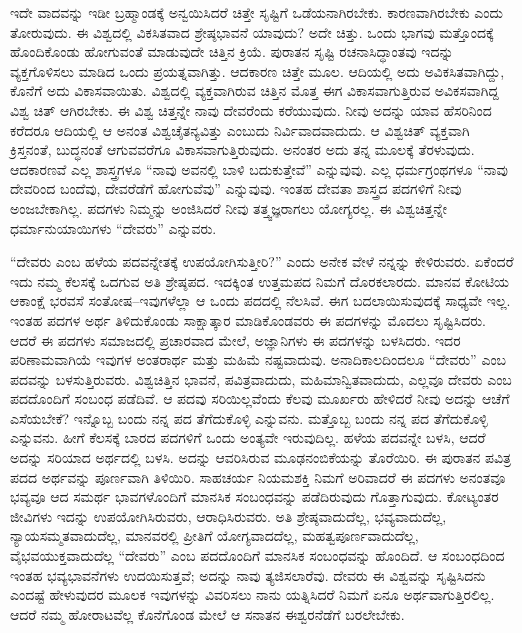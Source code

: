 ಇದೇ ವಾದವನ್ನು ಇಡೀ ಬ್ರಹ್ಮಾಂಡಕ್ಕೆ ಅನ್ವಯಿಸಿದರೆ ಚಿತ್ತೇ ಸೃಷ್ಟಿಗೆ ಒಡೆಯನಾಗಿರಬೇಕು. ಕಾರಣವಾಗಿರಬೇಕು ಎಂದು ತೋರುವುದು. ಈ ವಿಶ್ವದಲ್ಲಿ ವಿಕಸಿತವಾದ ಶ್ರೇಷ್ಠಭಾವನೆ ಯಾವುದು? ಅದೇ ಚಿತ್ತು. ಒಂದು ಭಾಗವು ಮತ್ತೊಂದಕ್ಕೆ ಹೊಂದಿಕೊಂಡು ಹೋಗುವಂತೆ ಮಾಡುವುದೇ ಚಿತ್ತಿನ ಕ್ರಿಯೆ. ಪುರಾತನ ಸೃಷ್ಟಿ ರಚನಾಸಿದ್ಧಾಂತವು ಇದನ್ನು ವ್ಯಕ್ತಗೊಳಿಸಲು ಮಾಡಿದ ಒಂದು ಪ್ರಯತ್ನವಾಗಿತ್ತು. ಆದಕಾರಣ ಚಿತ್ತೇ ಮೂಲ. ಆದಿಯಲ್ಲಿ ಅದು ಅವಿಕಸಿತವಾಗಿದ್ದು, ಕೊನೆಗೆ ಅದು ವಿಕಾಸವಾಯಿತು. ವಿಶ್ವದಲ್ಲಿ ವ್ಯಕ್ತವಾಗಿರುವ ಚಿತ್ತಿನ ಮೊತ್ತ ಈಗ ವಿಕಾಸವಾಗುತ್ತಿರುವ ಅವಿಕಸವಾಗಿದ್ದ ವಿಶ್ವ ಚಿತ್​ ಆಗಿರಬೇಕು. ಈ ವಿಶ್ವ ಚಿತ್ತನ್ನೇ ನಾವು ದೇವರೆಂದು ಕರೆಯುವುದು. ನೀವು ಅದನ್ನು ಯಾವ ಹೆಸರಿನಿಂದ ಕರೆದರೂ ಆದಿಯಲ್ಲಿ ಆ ಅನಂತ ವಿಶ್ವಚೈತನ್ಯವಿತ್ತು ಎಂಬುದು ನಿರ್ವಿವಾದವಾದುದು. ಆ ವಿಶ್ವಚಿತ್​ ವ್ಯಕ್ತವಾಗಿ ಕ್ರಿಸ್ತನಂತೆ, ಬುದ್ಧನಂತೆ ಆಗುವವರೆಗೂ ವಿಕಾಸವಾಗುತ್ತಿರುವುದು. ಅನಂತರ ಅದು ತನ್ನ ಮೂಲಕ್ಕೆ ತೆರಳುವುದು. ಆದಕಾರಣವೆ ಎಲ್ಲ ಶಾಸ್ತ್ರಗಳೂ “ನಾವು ಅವನಲ್ಲಿ ಬಾಳಿ ಬದುಕುತ್ತೇವೆ” ಎನ್ನುವುವು. ಎಲ್ಲ ಧರ್ಮಗ್ರಂಥಗಳೂ “ನಾವು ದೇವರಿಂದ ಬಂದೆವು, ದೇವರೆಡೆಗೆ ಹೋಗುವೆವು” ಎನ್ನುವುವು. ಇಂತಹ ದೇವತಾ ಶಾಸ್ತ್ರದ ಪದಗಳಿಗೆ ನೀವು ಅಂಜಬೇಕಾಗಿಲ್ಲ. ಪದಗಳು ನಿಮ್ಮನ್ನು ಅಂಜಿಸಿದರೆ ನೀವು ತತ್ತ್ವಜ್ಞರಾಗಲು ಯೋಗ್ಯರಲ್ಲ. ಈ ವಿಶ್ವಚಿತ್ತನ್ನೇ ಧರ್ಮಾನುಯಾಯಿಗಳು “ದೇವರು” ಎನ್ನುವರು.


“ದೇವರು ಎಂಬ ಹಳೆಯ ಪದವನ್ನೇತಕ್ಕೆ ಉಪಯೋಗಿಸುತ್ತೀರಿ?” ಎಂದು ಅನೇಕ ವೇಳೆ ನನ್ನನ್ನು ಕೇಳಿರುವರು. ಏಕೆಂದರೆ ಇದು ನಮ್ಮ ಕೆಲಸಕ್ಕೆ ಒದಗುವ ಅತಿ ಶ್ರೇಷ್ಠಪದ. ಇದಕ್ಕಿಂತ ಉತ್ತಮಪದ ನಿಮಗೆ ದೊರಕಲಾರದು. ಮಾನವ ಕೋಟಿಯ ಆಕಾಂಕ್ಷೆ ಭರವಸೆ ಸಂತೋಷ–ಇವುಗಳೆಲ್ಲಾ ಆ ಒಂದು ಪದದಲ್ಲಿ ನೆಲಸಿವೆ. ಈಗ ಬದಲಾಯಿಸುವುದಕ್ಕೆ ಸಾಧ್ಯವೇ ಇಲ್ಲ. ಇಂತಹ ಪದಗಳ ಅರ್ಥ ತಿಳಿದುಕೊಂಡು ಸಾಕ್ಷಾತ್ಕಾರ ಮಾಡಿಕೊಂಡವರು ಈ ಪದಗಳನ್ನು ಮೊದಲು ಸೃಷ್ಟಿಸಿದರು. ಆದರೆ ಈ ಪದಗಳು ಸಮಾಜದಲ್ಲಿ ಪ್ರಚಾರವಾದ ಮೇಲೆ, ಅಜ್ಞಾನಿಗಳು ಈ ಪದಗಳನ್ನು ಬಳಸಿದರು. ಇದರ ಪರಿಣಾಮವಾಗಿಯೆ ಇವುಗಳ ಅಂತರಾರ್ಥ ಮತ್ತು ಮಹಿಮೆ ನಷ್ಟವಾದುವು. ಅನಾದಿಕಾಲದಿಂದಲೂ “ದೇವರು” ಎಂಬ ಪದವನ್ನು ಬಳಸುತ್ತಿರುವರು. ವಿಶ್ವಚಿತ್ತಿನ ಭಾವನೆ, ಪವಿತ್ರವಾದುದು, ಮಹಿಮಾನ್ವಿತವಾದುದು, ಎಲ್ಲವೂ ದೇವರು ಎಂಬ ಪದದೊಂದಿಗೆ ಸಂಬಂಧ ಪಡೆದಿವೆ. ಆ ಪದವು ಸರಿಯಿಲ್ಲವೆಂದು ಕೆಲವು ಮೂರ್ಖರು ಹೇಳಿದರೆ ನೀವು ಅದನ್ನು ಆಚೆಗೆ ಎಸೆಯಬೇಕೆ? ಇನ್ನೊಬ್ಬ ಬಂದು ನನ್ನ ಪದ ತೆಗೆದುಕೊಳ್ಳಿ ಎನ್ನುವನು. ಮತ್ತೊಬ್ಬ ಬಂದು ನನ್ನ ಪದ ತೆಗೆದುಕೊಳ್ಳಿ ಎನ್ನುವನು. ಹೀಗೆ ಕೆಲಸಕ್ಕೆ ಬಾರದ ಪದಗಳಿಗೆ ಒಂದು ಅಂತ್ಯವೇ ಇರುವುದಿಲ್ಲ. ಹಳೆಯ ಪದವನ್ನೇ ಬಳಸಿ, ಆದರೆ ಅದನ್ನು ಸರಿಯಾದ ಅರ್ಥದಲ್ಲಿ ಬಳಸಿ. ಅದನ್ನು ಆವರಿಸಿರುವ ಮೂಢನಂಬಿಕೆಯನ್ನು ತೊರೆಯಿರಿ. ಈ ಪುರಾತನ ಪವಿತ್ರ ಪದದ ಅರ್ಥವನ್ನು ಪೂರ್ಣವಾಗಿ ತಿಳಿಯಿರಿ. ಸಾಹಚರ್ಯ ನಿಯಮಶಕ್ತಿ ನಿಮಗೆ ಅರಿವಾದರೆ ಈ ಪದಗಳು ಅನಂತವೂ ಭವ್ಯವೂ ಆದ ಸಮರ್ಥ ಭಾವಗಳೊಂದಿಗೆ ಮಾನಸಿಕ ಸಂಬಂಧವನ್ನು ಪಡೆದಿರುವುದು ಗೊತ್ತಾಗುವುದು. ಕೋಟ್ಯಂತರ ಜೀವಿಗಳು ಇದನ್ನು ಉಪಯೋಗಿಸಿರುವರು, ಆರಾಧಿಸಿರುವರು. ಅತಿ ಶ್ರೇಷ್ಠವಾದುದೆಲ್ಲ, ಭವ್ಯವಾದುದೆಲ್ಲ, ನ್ಯಾಯಸಮ್ಮತವಾದುದೆಲ್ಲ, ಮಾನವರಲ್ಲಿ ಪ್ರೀತಿಗೆ ಯೋಗ್ಯವಾದದೆಲ್ಲ, ಮಹತ್ವಪೂರ್ಣವಾದುದೆಲ್ಲ, ವೈಭವಯುಕ್ತವಾದುದೆಲ್ಲ “ದೇವರು” ಎಂಬ ಪದದೊಂದಿಗೆ ಮಾನಸಿಕ ಸಂಬಂಧವನ್ನು ಹೊಂದಿದೆ. ಆ ಸಂಬಂಧದಿಂದ ಇಂತಹ ಭವ್ಯಭಾವನೆಗಳು ಉದಯಿಸುತ್ತವೆ; ಅದನ್ನು ನಾವು ತ್ಯಜಿಸಲಾರೆವು. ದೇವರು ಈ ವಿಶ್ವವನ್ನು ಸೃಷ್ಟಿಸಿದನು ಎಂದಷ್ಟೆ ಹೇಳುವುದರ ಮೂಲಕ ಇವುಗಳನ್ನು ವಿವರಿಸಲು ನಾನು ಯತ್ನಿಸಿದರೆ ನಿಮಗೆ ಏನೂ ಅರ್ಥವಾಗುತ್ತಿರಲಿಲ್ಲ. ಆದರೆ ನಮ್ಮ ಹೋರಾಟವೆಲ್ಲ ಕೊನೆಗೊಂಡ ಮೇಲೆ ಆ ಸನಾತನ ಈಶ್ವರನೆಡೆಗೆ ಬರಲೇಬೇಕು.


